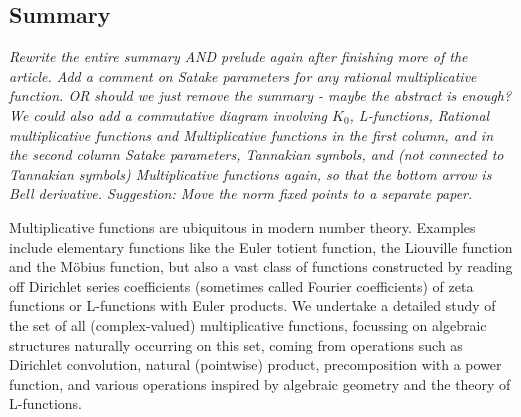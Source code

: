 \documentclass[a4paper]{article}
\begin{document}







\subsection{Summary}





\emph{Rewrite the entire summary AND prelude again after finishing more of the article. Add a comment on Satake parameters for any rational multiplicative function. OR should we just remove the summary - maybe the abstract is enough? We could also add a commutative diagram involving $K_0$, L-functions, Rational multiplicative functions and Multiplicative functions in the first column, and in the second column Satake parameters, Tannakian symbols, and (not connected to Tannakian symbols) Multiplicative functions again, so that the bottom arrow is Bell derivative. Suggestion: Move the norm fixed points to a separate paper.}

Multiplicative functions are ubiquitous in modern number theory. Examples include elementary functions like the Euler totient function, the Liouville function and the M\"obius function, but also a vast class of functions constructed by reading off Dirichlet series coefficients (sometimes called Fourier coefficients) of zeta functions or L-functions with Euler products. We undertake a detailed study of the set of all (complex-valued) multiplicative functions, focussing on algebraic structures naturally occurring on this set, coming from operations such as Dirichlet convolution, natural (pointwise) product, precomposition with a power function, and various operations inspired by algebraic geometry and the theory of L-functions. 
\end{document}
